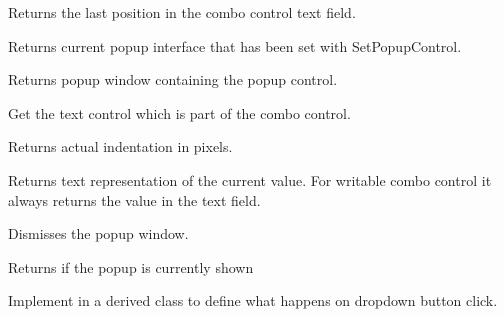 \label{wxcomboctrlgetlastposition}


Returns the last position in the combo control text field.


\label{wxcomboctrlgetpopupcontrol}


Returns current popup interface that has been set with SetPopupControl.


\label{wxcomboctrlgetpopupwindow}


Returns popup window containing the popup control.


\label{wxcomboctrlgettextctrl}


Get the text control which is part of the combo control.


\label{wxcomboctrlgettextindent}


Returns actual indentation in pixels.


\label{wxcomboctrlgetvalue}


Returns text representation of the current value. For writable
combo control it always returns the value in the text field.


\label{wxcomboctrlhidepopup}


Dismisses the popup window.


\label{wxcomboctrlispopupshown}


Returns \true if the popup is currently shown


\label{wxcomboctrlonbuttonclick}


Implement in a derived class to define what happens on
dropdown button click.

